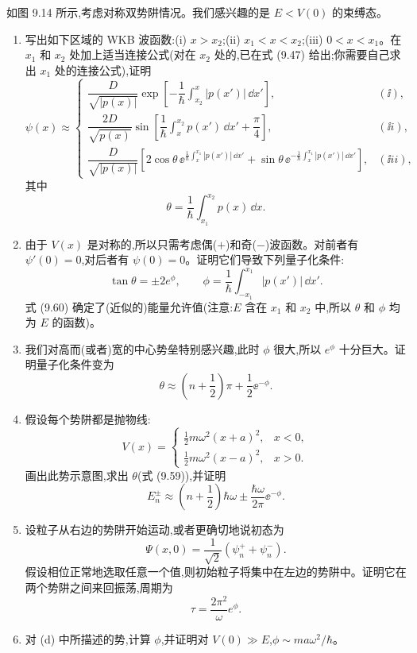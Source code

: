 \begin{question}
如图 9.14 所示,考虑对称双势阱情况。我们感兴趣的是 $E<V(0)$ 的束缚态。
\begin{enumerate}
\item 写出如下区域的 WKB 波函数:(i) $x>x_2$;(ii) $x_1<x<x_2$;(iii) $0<x<x_1$。在 $x_1$ 和 $x_2$ 处加上适当连接公式(对在 $x_2$ 处的,已在式 (9.47) 给出;你需要自己求出 $x_1$ 处的连接公式),证明
\[
\psi(x)\approx\begin{cases}
\dfrac{D}{\sqrt{|p(x)|}}\exp\left[-\dfrac{1}{\hbar}\int_{x_2}^{x}|p(x')|\,\dd x'\right], & (\ii),\\[1.2em]
\dfrac{2D}{\sqrt{p(x)}}\sin\left[\dfrac{1}{\hbar}\int_x^{x_2}p(x')\,\dd x'+\dfrac{\pi}{4}\right], & (\ii i),\\[1.2em]
\dfrac{D}{\sqrt{|p(x)|}}\left[2\cos\theta\,\ee^{\frac{1}{\hbar}\int_x^{x_1}|p(x')|\,\dd x'}+\sin\theta\,\ee^{-\frac{1}{\hbar}\int_x^{x_1}|p(x')|\,\dd x'}\right], & (\ii ii),
\end{cases}
\]
其中
\[
\theta=\frac{1}{\hbar}\int_{x_1}^{x_2}p(x)\,\dd x.
\]
\item 由于 $V(x)$ 是对称的,所以只需考虑偶($+$)和奇($-$)波函数。对前者有 $\psi'(0)=0$,对后者有 $\psi(0)=0$。证明它们导致下列量子化条件:
\[
\tan\theta=\pm2e^\phi,
\qquad
\phi=\frac{1}{\hbar}\int_{-x_1}^{x_1}|p(x')|\,\dd x'.
\]
式 (9.60) 确定了(近似的)能量允许值(注意:$E$ 含在 $x_1$ 和 $x_2$ 中,所以 $\theta$ 和 $\phi$ 均为 $E$ 的函数)。
\item 我们对高而(或者)宽的中心势垒特别感兴趣,此时 $\phi$ 很大,所以 $e^\phi$ 十分巨大。证明量子化条件变为
\[
\theta\approx \left(n+\frac12\right)\pi+\frac12\ee^{-\phi}.
\]
\item 假设每个势阱都是抛物线:
\[
V(x)=\begin{cases}
\frac12m\omega^2(x+a)^2, & x<0,\\
\frac12m\omega^2(x-a)^2, & x>0.
\end{cases}
\]
画出此势示意图,求出 $\theta$(式 (9.59)),并证明
\[
E_n^\pm\approx\left(n+\frac12\right)\hbar\omega\pm\frac{\hbar\omega}{2\pi}\ee^{-\phi}.
\]
\item 设粒子从右边的势阱开始运动,或者更确切地说初态为
\[
\Psi(x,0)=\frac{1}{\sqrt2}(\psi_n^++\psi_n^-).
\]
假设相位正常地选取任意一个值,则初始粒子将集中在左边的势阱中。证明它在两个势阱之间来回振荡,周期为
\[
\tau=\frac{2\pi^2}{\omega}e^\phi.
\]
\item 对 (d) 中所描述的势,计算 $\phi$,并证明对 $V(0)\gg E$,$\phi\sim ma\omega^2/\hbar$。
\end{enumerate}


\end{question}
